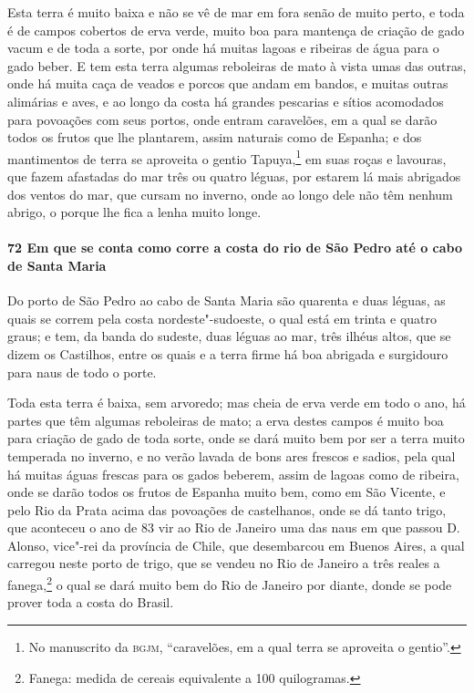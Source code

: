\begin{linenumbers}
Esta terra é muito baixa e não se vê de mar em fora senão de muito perto, e toda é de
campos cobertos de erva verde, muito boa para mantença de criação de gado vacum e de toda
a sorte, por onde há muitas lagoas e ribeiras de água para o gado beber. E tem esta terra
algumas reboleiras de mato à vista umas das outras, onde há muita caça de veados e porcos
que andam em bandos, e muitas outras alimárias e aves, e ao longo da costa há grandes
pescarias e sítios acomodados para povoações com seus portos, onde entram caravelões, em a
qual se darão todos os frutos que lhe plantarem, assim naturais como de Espanha; e dos
mantimentos de terra se aproveita o gentio Tapuya,\footnote{ No manuscrito da
\textsc{bgjm}, ``caravelões, em a qual terra se aproveita o gentio''.} em suas roças e
lavouras, que fazem afastadas do mar três ou quatro léguas, por estarem lá mais abrigados
dos ventos do mar, que cursam no inverno, onde ao longo dele não têm nenhum abrigo, o
porque lhe fica a lenha muito longe.

\paragraph{72 Em que se conta como corre a costa do rio de São Pedro até o cabo de Santa
Maria} \quad
Do porto de São Pedro ao cabo de Santa Maria são quarenta e duas léguas, as quais se
correm pela costa nordeste"-sudoeste, o qual está em trinta e quatro graus; e tem, da banda
do sudeste, duas léguas ao mar, três ilhéus altos, que se dizem os Castilhos, entre os
quais e a terra firme há boa abrigada e surgidouro para naus de todo o porte.

Toda esta terra é baixa, sem arvoredo; mas cheia de erva verde em todo o ano, há partes
que têm algumas reboleiras de mato; a erva destes campos é muito boa para criação de gado
de toda sorte, onde se dará muito bem por ser a terra muito temperada no inverno, e no
verão lavada de bons ares frescos e sadios, pela qual há muitas águas frescas para os
gados beberem, assim de lagoas como de ribeira, onde se darão todos os frutos de Espanha
muito bem, como em São Vicente, e pelo Rio da Prata acima das povoações de castelhanos,
onde se dá tanto trigo, que aconteceu o ano de 83 vir ao Rio de Janeiro uma das naus em
que passou D. Alonso, vice"-rei da província de Chile, que desembarcou em Buenos Aires, a
qual carregou neste porto de trigo, que se vendeu no Rio de Janeiro a três reales a
fanega,\footnote{ Fanega: medida de cereais equivalente a 100 quilogramas.} o qual se dará
muito bem do Rio de Janeiro por diante, donde se pode prover toda a costa do Brasil.


\end{linenumbers}
